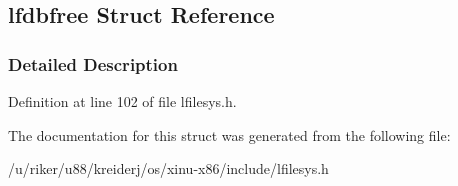 \hypertarget{structlfdbfree}{}\subsection{lfdbfree Struct Reference}
\label{structlfdbfree}


\subsubsection{Detailed Description}


Definition at line 102 of file lfilesys.\+h.



The documentation for this struct was generated from the following file\+:\begin{DoxyCompactItemize}
\item 
/u/riker/u88/kreiderj/os/xinu-\/x86/include/lfilesys.\+h\end{DoxyCompactItemize}
